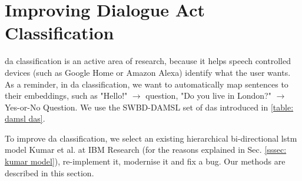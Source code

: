 
{\let\clearpage\relax \chapter[Dialogue Act Classification]{Improving Dialogue Act Classification\label{cpt: Method Dialogue Acts}}}

\gls{da} classification is an active area of research, because it helps speech controlled devices (such as Google Home or Amazon Alexa) identify what the user wants\cite{daApplications}. As a reminder, in \gls{da} classification, we want to automatically map sentences to their embeddings, such as "Hello!" $\rightarrow$ question, "Do you live in London?" $\rightarrow$ Yes-or-No Question. We use the SWBD-DAMSL set of \glspl{da} introduced in \ref{table: damsl das}.

To improve \gls{da} classification, we select an existing hierarchical bi-directional \gls{lstm} \gls{model} Kumar et al. at IBM Research\cite{kumar2017dialogue} (for the reasons explained in Sec. \ref{sssec: kumar model}), re-implement it, modernise it and fix a bug. Our methods are described in this section.



\glsresetall